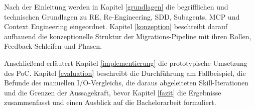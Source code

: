 Nach der Einleitung werden in Kapitel \ref{grundlagen} die begrifflichen und technischen Grundlagen zu RE, Re-Engineering, SDD, Subagents, MCP und Context Engineering eingeordnet. Kapitel \ref{konzeption} beschreibt darauf aufbauend die konzeptionelle Struktur der Migrations-Pipeline mit ihren Rollen, Feedback-Schleifen und Phasen.

Anschließend erläutert Kapitel \ref{implementierung} die prototypische Umsetzung des PoC. Kapitel \ref{evaluation} beschreibt die Durchführung am Fallbeispiel, die Befunde des manuellen I/O-Vergleichs, die daraus abgeleiteten Skill-Iterationen und die Grenzen der Aussagekraft, bevor Kapitel \ref{fazit} die Ergebnisse zusammenfasst und einen Ausblick auf die Bachelorarbeit formuliert.
